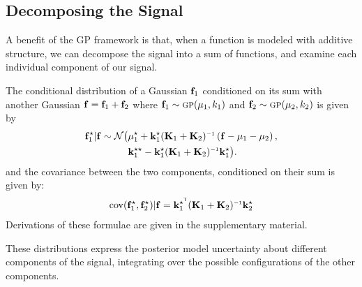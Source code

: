 \documentclass[twoside]{article}
\begin{document}


\subsection{Decomposing the Signal}

A benefit of the GP framework is that, when a function is modeled with additive structure, we can decompose the signal into a sum of functions, and examine each individual component of our signal.

The conditional distribution of a Gaussian ${\bf{f}}_1$ conditioned on its sum with another Gaussian ${\bf{f}} = {\bf{f}}_1 + {\bf{f}}_2$ where ${\bf{f}}_1 \sim {\textsc{gp}}( {\bf{\mu}}_1, k_1)$ and ${\bf{f}}_2 \sim {\textsc{gp}}( {\bf{\mu}}_2, k_2)$ is given by
\begin{align}
\vf_1^\star | \vf \sim \mathcal{N} \big( & \vmu_1^\star + \vk_1^\star (\vK_1 + \vK_2)\inv \left( \vf - \vmu_1 - \vmu_2 \right), \nonumber \\
& \vk_1^{\star\star} - \vk_1^\star (\vK_1 + \vK_2)\inv \vk_1^\star \big).
\end{align}
and the covariance between the two components, conditioned on their sum is given by:
\begin{align}
\cov(\vf_1^\star, \vf_2^\star) | \vf = \vk_1^{\star\tra} (\vK_1 + \vK_2)\inv \vk_2^\star
\end{align}
Derivations of these formulae are given in the supplementary material.

These distributions express the posterior model uncertainty about different components of the signal, integrating over the possible configurations of the other components.

\end{document}
